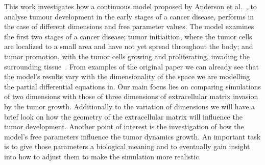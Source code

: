 This work investigates how a continuous model proposed by Anderson et al.~\cite{anderson_continuous_1998,anderson_mathematical_2000}, to analyse tumour development in the early stages of a cancer disease, performs in the case of different dimensions and free parameter values. The model examines the first two stages of a cancer disease; tumor initiaition, where the tumor cells are localized to a small area and have not yet spread throughout the body; and tumor promotion, with the tumor cells growing and proliferating, invading the surrounding tissue~\cite{10.1158/2159-8290.CD-21-1059}. From examples of the original paper we can already see that the model's results vary with the dimensionality of the space we are modelling the partial differential equations in. Our main focus lies on comparing simulations of two dimensions with those of three dimensions of extracellular matrix invasion by the tumor growth. Additionally to the variation of dimensions we will have a brief look on how the geometry of the extracellular matrix will influence the tumor development. \newline 
Another point of interest is the investigation of how the model's free parameters influence the tumor dynamics growth. An important task is to give those parameters a biological meaning and to eventually gain insight into how to adjust them to make the simulation more realistic.